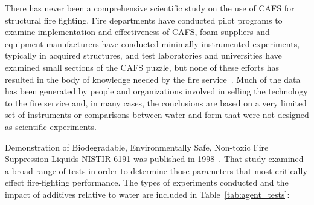 \documentclass[12pt,oneside]{book}
\begin{document}
There has never been a comprehensive scientific study on the use of CAFS for structural fire fighting.  Fire departments have conducted pilot programs to examine implementation and effectiveness of CAFS, foam suppliers and equipment manufacturers have conducted minimally instrumented experiments, typically in acquired structures, and test laboratories and universities have examined small sections of the CAFS puzzle, but none of these efforts has resulted in the body of knowledge needed by the fire service~\cite{Madrzykowski:3,USFA:CAFS,Colletti:1,Boyd:1,Tafreshi:1,Madrzykowski:4,Colletti:2,Tafreshi:2,Lorh:2002,Colletti:3,Kim:2012}. Much of the data has been generated by people and organizations involved in selling the technology to the fire service and, in many cases, the conclusions are based on a very limited set of instruments or comparisons between water and form that were not designed as scientific experiments.

Demonstration of Biodegradable, Environmentally Safe, Non-toxic Fire Suppression Liquids NISTIR 6191 was published in 1998~\cite{Madrzykowski:4}. That study examined a broad range of tests in order to determine those parameters that most critically effect fire-fighting performance.  The types of experiments conducted and the impact of additives relative to water are included in Table~\ref{tab:agent_tests}:
\end{document}
